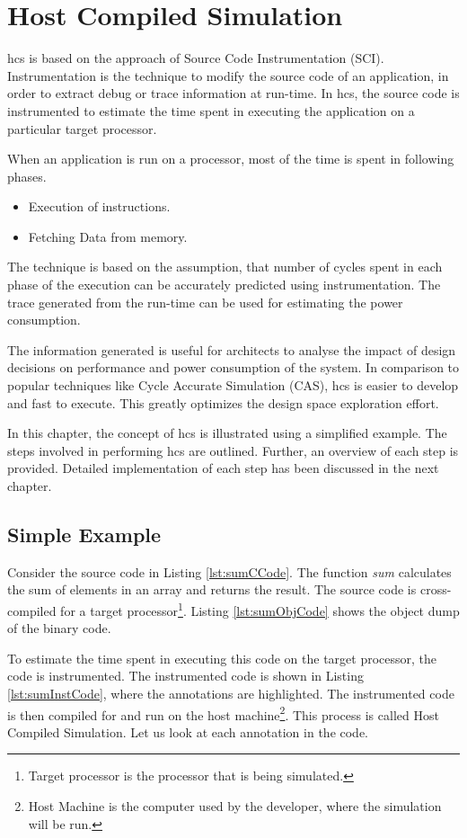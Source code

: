 \chapter{Host Compiled Simulation}

\gls{hcs} is based on the approach of Source Code Instrumentation (SCI). Instrumentation is the technique to modify the source code of an application, in order to extract debug or trace information at run-time. In \gls{hcs}, the source code is instrumented to estimate the time spent in executing the application on a particular target processor. 

When an application is run on a processor, most of the time is spent in following phases.
\begin{itemize} \itemsep -6pt
\item Execution of instructions.
\item Fetching Data from memory.
\end{itemize}

The technique is based on the assumption, that number of cycles spent in each phase of the execution can be accurately predicted using instrumentation. The trace generated from the run-time can be used for estimating the power consumption.

The information generated is useful for architects to analyse the impact of design decisions on performance and power consumption of the system. In comparison to popular techniques like Cycle Accurate Simulation (CAS), \gls{hcs} is easier to develop and fast to execute. This greatly optimizes the design space exploration effort.

In this chapter, the concept of \gls{hcs} is illustrated using a simplified example. The steps involved in performing \gls{hcs} are outlined. Further, an overview of each step is provided. Detailed implementation of each step has been discussed in the next chapter.

\section{Simple Example}
\label{sec:SimpleExample}
Consider the source code in Listing \ref{lst:sumCCode}. The function \emph{sum} calculates the sum of elements in an array and returns the result. The source code is cross-compiled for a target processor\footnote{Target processor is the processor that is being simulated.}. Listing \ref{lst:sumObjCode} shows the object dump of the binary code. 

To estimate the time spent in executing this code on the target processor, the code is instrumented. The instrumented code is shown in Listing \ref{lst:sumInstCode}, where the annotations are highlighted. The instrumented code is then compiled for and run on the host machine\footnote{Host Machine is the computer used by the developer, where the simulation will be run.}. This process is called Host Compiled Simulation. Let us look at each annotation in the code.

